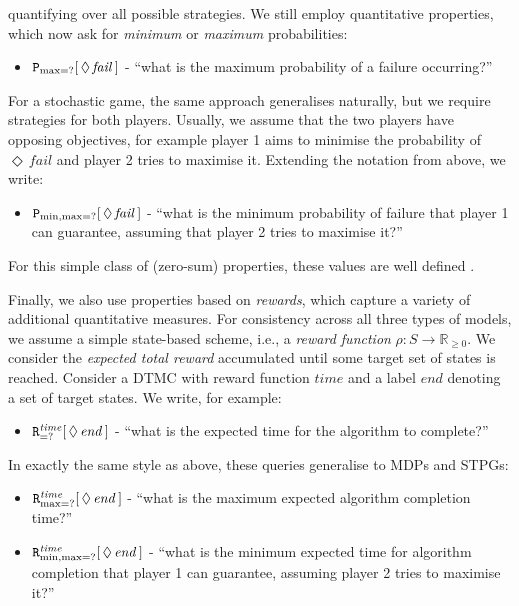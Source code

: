 \documentclass{llncs}
\def\Rsetgeq{\mathbb{R}_{\geq 0}}
\begin{document}
quantifying over all possible strategies.
We still employ quantitative properties,
which now ask for \emph{minimum} or \emph{maximum} probabilities:
\begin{itemize}
\item ${\tt P}_{\max=?}[\,\Diamond\,\mathit{fail}\,]$ -
``what is the maximum probability of a failure occurring?''
\end{itemize}
For a stochastic game, the same approach generalises naturally,
but we require strategies for both players.
Usually, we assume that the two players have opposing objectives,
for example player 1 aims to minimise the probability of $\Diamond\,\mathit{fail}$
and player 2 tries to maximise it.
Extending the notation from above, we write:
\begin{itemize}
\item ${\tt P}_{\min,\max=?}[\,\Diamond\,\mathit{fail}\,]$ -
``what is the minimum probability of failure that player 1 can guarantee,
assuming that player 2 tries to maximise it?''
\end{itemize}
%
For this simple class of (zero-sum) properties,
these values are well defined \cite{Con92}.

Finally, we also use properties based on \emph{rewards},
which capture a variety of additional quantitative measures.
For consistency across all three types of models,
we assume a simple state-based scheme,
i.e., a \emph{reward function} $\rho:S\rightarrow\Rsetgeq$.
We consider the \emph{expected total reward} accumulated until some target set of states is reached.
Consider a DTMC with reward function $\mathit{time}$
and a label $\mathit{end}$ denoting a set of target states.
We write, for example:
\begin{itemize}
\item ${\tt R}^{\mathit{time}}_{=?}[\,\Diamond\,\mathit{end}\,]$ -
``what is the expected time for the algorithm to complete?''
\end{itemize}
In exactly the same style as above, these queries generalise to MDPs and STPGs: %
\begin{itemize}\addtolength{\itemsep}{2pt}
\item ${\tt R}^{\mathit{time}}_{\max=?}[\,\Diamond\,\mathit{end}\,]$ -
``what is the maximum expected algorithm completion time?''
\item ${\tt R}^{\mathit{time}}_{\min,\max=?}[\,\Diamond\,\mathit{end}\,]$ -
``what is the minimum expected time for algorithm completion
that player 1 can guarantee, assuming player 2 tries to maximise it?''
\end{itemize}
\end{document}
